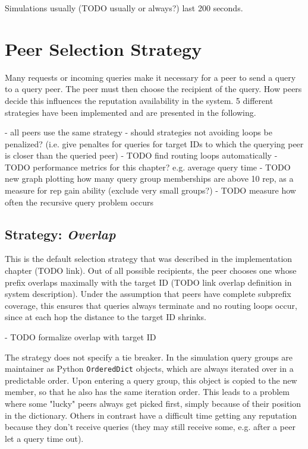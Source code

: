 Simulations usually (TODO usually or always?) last 200 seconds.

\section{Peer Selection Strategy}
Many requests or incoming queries make it necessary for a peer to send a query
to a query peer. The peer must then choose the recipient of the query. How peers
decide this influences the reputation availability in the system. 5 different
strategies have been implemented and are presented in the following.

- all peers use the same strategy
- should strategies not avoiding loops be penalized? (i.e. give penaltes for
  queries for target IDs to which the querying peer is closer than the queried
  peer)
- TODO find routing loops automatically
- TODO performance metrics for this chapter? e.g. average query time
- TODO new graph plotting how many query group memberships are above 10 rep, as
  a measure for rep gain ability (exclude very small groups?)
- TODO measure how often the recursive query problem occurs

\subsection{Strategy: \emph{Overlap}}
This is the default selection strategy that was described in the implementation
chapter (TODO link). Out of all possible recipients, the peer chooses one whose
prefix overlaps maximally with the target ID (TODO link overlap definition in
system description). Under the assumption that peers have complete subprefix
coverage, this ensures that queries always terminate and no routing loops occur,
since at each hop the distance to the target ID shrinks.

- TODO formalize overlap with target ID

The strategy does not specify a tie breaker. In the simulation query groups are
maintainer as Python \texttt{OrderedDict} objects, which are always iterated
over in a predictable order. Upon entering a query group, this object is copied
to the new member, so that he also has the same iteration order. This leads to a
problem where some "lucky" peers always get picked first, simply because of
their position in the dictionary. Others in contrast have a difficult time
getting any reputation because they don't receive queries (they may still
receive some, e.g.  after a peer let a query time out).

